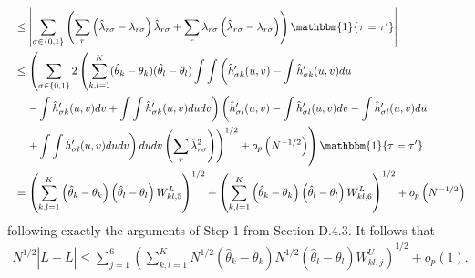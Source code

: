 \documentclass[12pt]{article}
\theoremstyle{definition}
\begin{document}
{\begin{align*}
 &\hspace{2mm}\leq \left|\sum_{\sigma\in \{0,1\}}\left( \sum_{r}\left(\hat{\lambda}_{r\sigma} - \lambda_{r\sigma}\right)\hat{\lambda}_{r\sigma} + \sum_{r}\lambda_{r\sigma}\left(\hat{\lambda}_{r\sigma} - \lambda_{r\sigma}\right) \right)\mathbbm{1}\{\tau = \tau'\}\right| \\
   &\hspace{2mm}\leq \left(\sum_{\sigma \in \{0,1\}}2\left(\sum_{k,l=1}^{K}(\hat{\theta}_{k} - \theta_{k})(\hat{\theta}_{l} - \theta_{l})\int\int\left(\hat{h}'_{\sigma k}(u,v)- \int\hat{h}'_{\sigma k}(u,v)du \right.\right.\right. \\
&\hspace{5mm}\left.\left.\left. - \int\hat{h}'_{\sigma k}(u,v)dv + \int\int\hat{h}'_{\sigma k}(u,v)dudv\right)\left(\hat{h}'_{\sigma l}(u,v) - \int\hat{h}'_{\sigma l}(u,v)dv - \int\hat{h}'_{\sigma l}(u,v)du \right.\right.\right. \\
&\hspace{5mm}\left.\left. \left. + \int\int\hat{h}'_{\sigma l}(u,v)dudv\right)dudv \left(\sum_{r} \hat{\lambda}_{r\sigma}^{2}\right)\right)^{1/2}+ o_{p}\left(N^{-1/2}\right)\right)\mathbbm{1}\{\tau = \tau'\} \\
&\hspace{2mm}= \left(\sum_{k,l=1}^{K} \left(\hat{\theta}_{k} - \theta_{k}\right)\left(\hat{\theta}_{l} - \theta_{l}\right)W^{L}_{kl,5}\right)^{1/2} + \left(\sum_{k,l=1}^{K} \left(\hat{\theta}_{k} - \theta_{k}\right)\left(\hat{\theta}_{l} - \theta_{l}\right)W^{L}_{kl,6}\right)^{1/2} + o_{p}\left( N^{-1/2}\right)
\end{align*}
following exactly the arguments of Step 1 from Section D.4.3. It follows that
\begin{align*}
N^{1/2}|\hat{L} - L| \leq\sum_{j = 1}^{6} \left(\sum_{k,l=1}^{K} N^{1/2}\left(\hat{\theta}_{k} - \theta_{k}\right)N^{1/2}\left(\hat{\theta}_{l} - \theta_{l}\right)W^{U}_{kl,j}\right)^{1/2}  + o_{p}\left( 1\right).
\end{align*}

}
\end{document}
